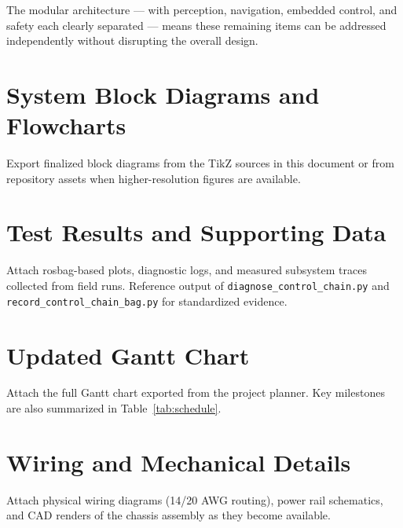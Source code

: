 \documentclass[12pt,a4paper]{report}
\begin{document}
The modular architecture --- with perception, navigation, embedded control, and safety each clearly separated --- means these remaining items can be addressed independently without disrupting the overall design.

\begin{appendices}

\chapter{System Block Diagrams and Flowcharts}
Export finalized block diagrams from the TikZ sources in this document or from repository assets when higher-resolution figures are available.

\chapter{Test Results and Supporting Data}
Attach rosbag-based plots, diagnostic logs, and measured subsystem traces collected from field runs. Reference output of \texttt{diagnose\_control\_chain.py} and \texttt{record\_control\_chain\_bag.py} for standardized evidence.

\chapter{Updated Gantt Chart}
Attach the full Gantt chart exported from the project planner. Key milestones are also summarized in Table~\ref{tab:schedule}.

\chapter{Wiring and Mechanical Details}
Attach physical wiring diagrams (14/20 AWG routing), power rail schematics, and CAD renders of the chassis assembly as they become available.

\end{appendices}
\end{document}
